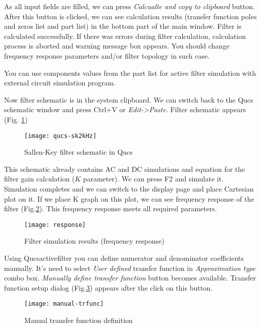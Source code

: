 As all input fields are filled, we can press \emph{Calcualte and copy to
clipboard} button. After this button is clicked, we can see calculation
results (transfer function poles and zeros list and part list) in the bottom
part of the main window. Filter is calculated successfully. If there was errors
during filter calculation, calculation process is aborted and warning message
box appears. You should change frequency response parameters and/or filter
topology in such case.

You can use components values from the part list for active filter simulation
with external circuit simulation program.


Now filter
schematic is in the system clipboard. We can switch back to the Qucs schematic
window and press Ctrl+V or \emph{Edit->Paste}. Filter schematic appears (Fig.
\ref{fig:sk2kHz-qucs})

\begin{figure}[!ht]
  \centering
  \texttt{[image: qucs-sk2kHz]}
  \caption{Sallen-Key filter schematic in Qucs}
  \label{fig:sk2kHz-qucs}
\end{figure}
\FloatBarrier

This schematic already contains AC and DC simulations and equation for the
filter gain calculation ($K$ parameter). We can press F2 and simulate it.
Simulation completes and we can switch to the display page and place Cartesian
plot on it. If we place K graph on this plot, we can see frequency response of
the filter (Fig.\ref{fig:resp}). This frequency response meets all required
parameters.

\begin{figure}[!ht]
  \centering
  \texttt{[image: response]}
  \caption{Filter simulation results (frequency response)}
  \label{fig:resp}
\end{figure}
\FloatBarrier


Using Qucsactivefilter you can define numerator and denominator coefficients
manually. It's need to select \emph{User defined} transfer function in
\emph{Approximation type} combo box. \emph{Manually define transfer function}
button becomes available. Transfer function setup dialog
(Fig.\ref{fig:mantrfunc})
appears after the click on this button.

\begin{figure}[ht]
  \centering
  \texttt{[image: manual-trfunc]}
  \caption{Manual transfer function definition}
  \label{fig:mantrfunc}
\end{figure}
\FloatBarrier

